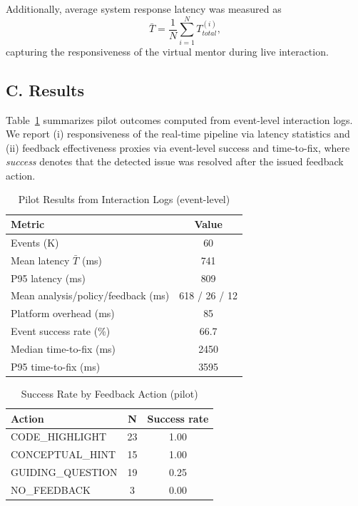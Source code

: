 \documentclass[conference]{IEEEtran}
\begin{document}
Additionally, average system response latency was measured as
\[
\bar{T} = \frac{1}{N} \sum_{i=1}^{N} T_{total}^{(i)},
\]
capturing the responsiveness of the virtual mentor during live interaction.


\subsection*{C. Results}

Table~\ref{tab:results} summarizes pilot outcomes computed from event-level interaction logs.
We report (i) responsiveness of the real-time pipeline via latency statistics and
(ii) feedback effectiveness proxies via event-level success and time-to-fix, where
\emph{success} denotes that the detected issue was resolved after the issued feedback action.

\begin{table}[t]
\centering
\caption{Pilot Results from Interaction Logs (event-level)}
\label{tab:results}
\renewcommand{\arraystretch}{1.15}
\begin{tabular}{lc}
\hline
\textbf{Metric} & \textbf{Value} \\
\hline
Events (K) & 60 \\
Mean latency $\bar{T}$ (ms) & 741 \\
P95 latency (ms) & 809 \\
Mean analysis/policy/feedback (ms) & 618 / 26 / 12 \\
Platform overhead (ms) & 85 \\
Event success rate (\%) & 66.7 \\
Median time-to-fix (ms) & 2450 \\
P95 time-to-fix (ms) & 3595 \\
\hline
\end{tabular}
\end{table}

\begin{table}[t]
\centering
\caption{Success Rate by Feedback Action (pilot)}
\label{tab:action_success}
\renewcommand{\arraystretch}{1.15}
\begin{tabular}{lcc}
\hline
\textbf{Action} & \textbf{N} & \textbf{Success rate} \\
\hline
CODE\_HIGHLIGHT & 23 & 1.00 \\
CONCEPTUAL\_HINT & 15 & 1.00 \\
GUIDING\_QUESTION & 19 & 0.25 \\
NO\_FEEDBACK & 3 & 0.00 \\
\hline
\end{tabular}
\end{table}
\end{document}
